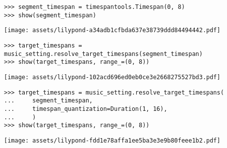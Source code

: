 \begin{comment}
<abjad>
segment_timespan = timespantools.Timespan(0, 8)
show(segment_timespan)
target_timespans = music_setting.resolve_target_timespans(segment_timespan)
show(target_timespans, range_=(0, 8))
</abjad>
\end{comment}

\begin{singlespacing}
\vspace{-0.5\baselineskip}
\begin{lstlisting}
>>> segment_timespan = timespantools.Timespan(0, 8)
>>> show(segment_timespan)
\end{lstlisting}
\noindent\texttt{[image: assets/lilypond-a34adb1cfbda637e38739ddd84494442.pdf]}
\begin{lstlisting}
>>> target_timespans = music_setting.resolve_target_timespans(segment_timespan)
>>> show(target_timespans, range_=(0, 8))
\end{lstlisting}
\noindent\texttt{[image: assets/lilypond-102acd696ed0eb0ce3e2668275527bd3.pdf]}
\end{singlespacing}

\begin{comment}
<abjad>
target_timespans = music_setting.resolve_target_timespans(
    segment_timespan,
    timespan_quantization=Duration(1, 16),
    )
show(target_timespans, range_=(0, 8))
</abjad>
\end{comment}

\begin{singlespacing}
\vspace{-0.5\baselineskip}
\begin{lstlisting}
>>> target_timespans = music_setting.resolve_target_timespans(
...     segment_timespan,
...     timespan_quantization=Duration(1, 16),
...     )
>>> show(target_timespans, range_=(0, 8))
\end{lstlisting}
\noindent\texttt{[image: assets/lilypond-fdd1e78affa1ee5ba3e3e9b80feee1b2.pdf]}
\end{singlespacing}

\begin{comment}
<abjad>
music_setting = new(
    music_setting,
    timespan_identifier__mask_timespan=timespantools.Timespan(
        start_offset=(1, 2),
        stop_offset=7,
        ),
    )
target_timespans = music_setting.resolve_target_timespans(segment_timespan)
show(target_timespans, range_=(0, 8))
</abjad>
\end{comment}

